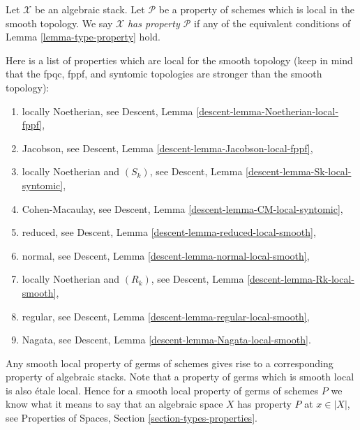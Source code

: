 \begin{definition}
\label{definition-type-property}
Let $\mathcal{X}$ be an algebraic stack.
Let $\mathcal{P}$ be a property of schemes which is
local in the smooth topology.
We say $\mathcal{X}$ {\it has property $\mathcal{P}$}
if any of the equivalent conditions of
Lemma \ref{lemma-type-property}
hold.
\end{definition}

\begin{remark}
\label{remark-list-properties-local-smooth-topology}
Here is a list of properties which are local for the smooth topology
(keep in mind that the fpqc, fppf, and syntomic topologies are
stronger than the smooth topology):
\begin{enumerate}
\item locally Noetherian, see
Descent, Lemma \ref{descent-lemma-Noetherian-local-fppf},
\item Jacobson, see
Descent, Lemma \ref{descent-lemma-Jacobson-local-fppf},
\item locally Noetherian and $(S_k)$, see
Descent, Lemma \ref{descent-lemma-Sk-local-syntomic},
\item Cohen-Macaulay, see
Descent, Lemma \ref{descent-lemma-CM-local-syntomic},
\item reduced, see
Descent, Lemma \ref{descent-lemma-reduced-local-smooth},
\item normal, see
Descent, Lemma \ref{descent-lemma-normal-local-smooth},
\item locally Noetherian and $(R_k)$, see
Descent, Lemma \ref{descent-lemma-Rk-local-smooth},
\item regular, see
Descent, Lemma \ref{descent-lemma-regular-local-smooth},
\item Nagata, see
Descent, Lemma \ref{descent-lemma-Nagata-local-smooth}.
\end{enumerate}
\end{remark}

\noindent
Any smooth local property of germs of schemes gives rise to a corresponding
property of algebraic stacks. Note that a property of germs which is smooth
local is also \'etale local. Hence for a smooth local property of germs of
schemes $P$ we know what it means to say that an algebraic space $X$ has
property $P$ at $x \in |X|$, see
Properties of Spaces, Section \ref{section-types-properties}.

